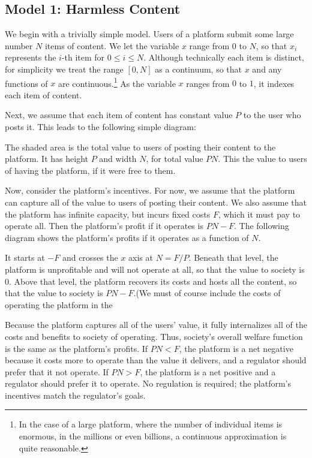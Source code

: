 \subsection{Model 1: Harmless Content}

We begin with a trivially simple model. Users of a platform submit some large number $N$ items of content. We let the variable $x$ range from $0$ to $N$, so that $x_i$ represents the $i$-th item for $0 \le i \le N$. Although technically each item is distinct, for simplicity we treat the range $[0,N]$ as a continuum, so that $x$ and any functions of $x$ are continuous.\footnote{In the  case of a large platform, where the number of individual items is enormous, in the millions or even billions, a continuous approximation is quite reasonable.} As the variable $x$ ranges from $0$ to $1$, it indexes each item of content.
 
Next, we assume that each item of content has constant value $P$ to the user who posts it. This leads to the following simple diagram:


The shaded area is the total value to users of posting their content to the platform. It has height $P$ and width $N$, for total value $PN$. This the value to users of having the platform, if it were free to them.

Now, consider the platform's incentives. For now, we assume that the platform can capture all of the value to users of posting their content. We also assume that the platform has infinite capacity, but incurs fixed costs $F$, which it must pay to operate all. Then the platform's profit if it operates is $PN - F$. The following diagram shows the platform's profits if it operates as a function of $N$.


It starts at $-F$ and crosses the $x$ axis at $N = F/P$. Beneath that level, the platform is unprofitable and will not operate at all, so that the value to society is $0$. Above that level, the platform recovers its costs and hosts all the content, so that the value to society is $PN - F $.(We must of course include the costs of operating the platform in the 

Because the platform captures all of the users' value, it fully internalizes all of the costs and benefits to society of operating. Thus, society's overall welfare function is the same as the platform's profits. If $PN < F$, the platform is a net negative because it costs more to operate than the value it delivers, and a regulator should prefer that it not operate. If $PN > F$, the platform is a net positive and a regulator should prefer it to operate. No regulation is required; the platform's incentives match the regulator's goals.

